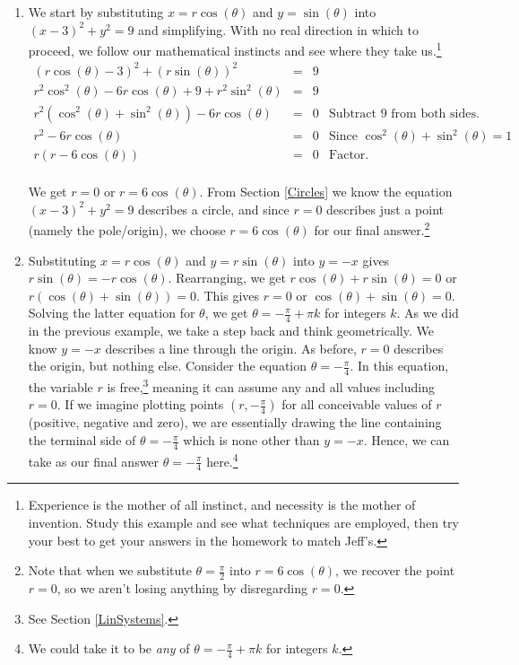 \begin{ex}
\begin{enumerate}
\begin{enumerate}

\item We start by substituting  $x = r\cos(\theta)$ and $y = \sin(\theta)$ into $(x-3)^2 + y^2 = 9$ and simplifying.  With no real direction in which to proceed, we follow our mathematical instincts and see where they take us.\footnote{Experience is the mother of all instinct, and necessity is the mother of invention.  Study this example and see what techniques are employed, then try your best to get your answers in the homework to match Jeff's.}
\[ \begin{array}{rclr}

(r\cos(\theta) - 3)^2+ (r\sin(\theta))^2 & = & 9& \\[3pt]
r^2\cos^2(\theta) - 6 r\cos(\theta) + 9 + r^2 \sin^{2}(\theta) & = &  9 \\[3pt]
r^2\left(\cos^2(\theta) + \sin^{2}(\theta)\right) - 6 r\cos(\theta) & = & 0 & \text{Subtract $9$ from both sides.}\\[3pt]
r^2 - 6 r\cos(\theta) & = & 0 & \text{Since $\cos^2(\theta) + \sin^2(\theta) = 1$} \\[3pt]
r(r - 6 \cos(\theta)) & = & 0 &  \text{Factor.} \\ \end{array} \]

We get $r = 0$ or $r = 6\cos(\theta)$.  From Section \ref{Circles} we know the equation $(x-3)^2 + y^2 = 9$ describes a circle, and since $r=0$ describes just a point (namely the pole/origin), we choose $r = 6\cos(\theta)$ for our final answer.\footnote{Note that when we substitute $\theta = \frac{\pi}{2}$ into $r = 6\cos(\theta)$,  we recover the point $r = 0$, so we aren't losing anything by disregarding $r=0$.}

\item  Substituting $x = r\cos(\theta)$ and $y = r\sin(\theta)$ into $y=-x$ gives $r\sin(\theta)= -r\cos(\theta)$. Rearranging, we get  $r\cos(\theta) + r\sin(\theta) = 0$ or $r(\cos(\theta) + \sin(\theta)) = 0$.  This gives $r=0$ or $\cos(\theta) + \sin(\theta) = 0$.  Solving the latter equation for $\theta$, we get $\theta = -\frac{\pi}{4} + \pi k$ for integers $k$. As we did in the previous example, we take a step back and think geometrically. We know $y=-x$ describes a line through the origin.  As before, $r=0$ describes the origin, but nothing else.  Consider the equation $\theta = -\frac{\pi}{4}$.  In this equation, the variable $r$ is free,\footnote{See Section \ref{LinSystems}.} meaning it can assume any and all values including $r=0$. If we imagine plotting points $(r, -\frac{\pi}{4})$  for all conceivable values of $r$ (positive, negative and zero), we are essentially drawing the line containing the terminal side of $\theta = -\frac{\pi}{4}$ which is none other than $y = -x$.  Hence, we can take as our final answer   $\theta = -\frac{\pi}{4}$ here.\footnote{We could take it to be \textit{any} of $\theta = -\frac{\pi}{4} + \pi k$ for integers $k$.} 


\end{enumerate}
\end{enumerate}
\end{ex}
